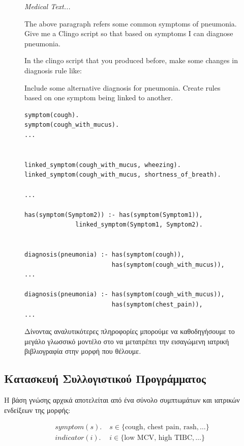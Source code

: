 \documentclass[10pt,leqno]{amsart}
\newenvironment{commandline}{
	\medskip
	\begin{mdframed}[style=commandline]
}{
	\end{mdframed}
	\medskip
}
\newenvironment{prompt}[1][Prompt:]{ %
	\medskip
	\begin{mdframed}[style=warning]
		\noindent{\textbf{#1}}
}{
	\end{mdframed}
}
\begin{document}
\begin{figure}[!h]
\begin{prompt}
\textit{Medical Text...}

The above paragraph refers some common symptoms of pneumonia.
Give me a Clingo script so that based on symptoms I can diagnose pneumonia.

In the clingo script that you produced before, make some changes in diagnosis rule like:

Include some alternative diagnosis for pneumonia.
Create rules based on one symptom being linked to another.
\end{prompt}


\begin{commandline}
\scriptsize
\begin{verbatim}
symptom(cough).
symptom(cough_with_mucus).
...


linked_symptom(cough_with_mucus, wheezing).
linked_symptom(cough_with_mucus, shortness_of_breath).

...

has(symptom(Symptom2)) :- has(symptom(Symptom1)), 
              linked_symptom(Symptom1, Symptom2).


diagnosis(pneumonia) :- has(symptom(cough)),
                        has(symptom(cough_with_mucus)),
...

diagnosis(pneumonia) :- has(symptom(cough_with_mucus)),
                        has(symptom(chest_pain)),
...
\end{verbatim}
\end{commandline}
\caption{Δίνοντας αναλυτικότερες πληροφορίες μπορούμε να καθοδηγήσουμε το μεγάλο γλωσσικό μοντέλο στο να μετατρέπει την εισαγώμενη ιατρική βιβλιογραφία στην μορφή που θέλουμε.}
\label{fig:good-prompt}
\end{figure}

\subsection{Κατασκευή Συλλογιστικού Προγράμματος}

Η βάση γνώσης αρχικά αποτελείται από ένα σύνολο συμπτωμάτων και ιατρικών ενδείξεων της μορφής: 

\begin{align}
    symptom(s). & \; s \in \{ \text{cough, chest pain, rash}, \dots \} \\
    indicator(i). & \; i \in \{ \text{low MCV, high TIBC}, \dots \}
\end{align}
\end{document}
